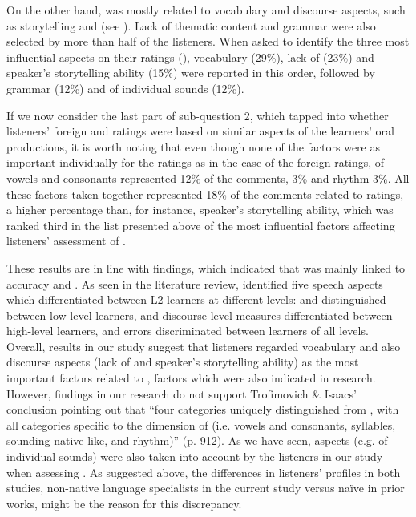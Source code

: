 \documentclass[output=paper]{langsci/langscibook}
\begin{document}
\largerpage
On the other hand,  was mostly related to vocabulary and discourse aspects, such as storytelling and  (see ). Lack of thematic content and grammar were also selected by more than half of the listeners. When asked to identify the three most influential aspects on their  ratings (), vocabulary (29\%), lack of  (23\%) and speaker’s storytelling ability (15\%) were reported in this order, followed by grammar (12\%) and  of individual sounds (12\%). 

If we now consider the last part of sub-question 2, which tapped into whether listeners’ foreign  and  ratings were based on similar aspects of the learners’ oral productions, it is worth noting that even though none of the  factors were as important individually for the  ratings as in the case of the foreign  ratings,  of vowels and consonants represented 12\% of the comments,  3\% and rhythm 3\%. All these  factors taken together represented 18\% of the comments related to  ratings, a higher percentage than, for instance, speaker’s storytelling ability, which was ranked third in the list presented above of the most influential factors affecting listeners’ assessment of . 

These results are in line with  findings, which indicated that  was mainly linked to  accuracy and . As seen in the literature review, \citet{TrofimovichIsaacs2012} identified five speech aspects which differentiated between {L2} learners at different  levels:  and  distinguished between low-level learners,  and discourse-level measures differentiated between high-level learners, and  errors discriminated between learners of all levels. Overall, results in our study suggest that listeners regarded vocabulary and also discourse aspects (lack of  and speaker’s storytelling ability) as the most important factors related to , factors which were also indicated in   research. However, findings in our research do not support Trofimovich \& Isaacs’ conclusion pointing out that “four categories uniquely distinguished  from , with all categories specific to the dimension of  (i.e. vowels and consonants, syllables, sounding native-like, and rhythm)” (p. 912).   As we have seen,  aspects (e.g.  of individual sounds) were also taken into account by the listeners in our study when assessing . As suggested above, the differences in listeners’ profiles in both studies, non-native language specialists in the current study versus naïve  in prior works, might be the reason for this discrepancy. 
\end{document}
